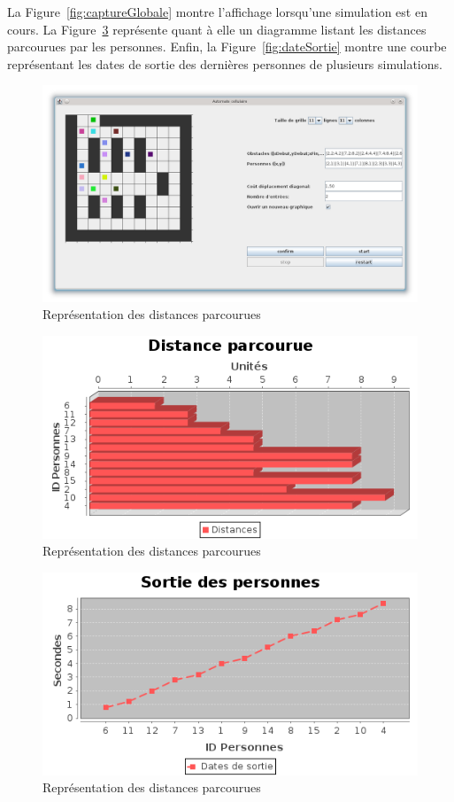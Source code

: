 	La Figure~\ref{fig:captureGlobale} montre l'affichage lorsqu'une simulation est en cours. La Figure~\ref{fig:distances_parcourues} représente quant à elle un diagramme listant les distances parcourues par les personnes. Enfin, la Figure~\ref{fig:dateSortie} montre une courbe représentant les dates de sortie des dernières personnes de plusieurs simulations.

	\begin{figure}[H]
	\centering
	\includegraphics[scale=0.4]{imagesPNG/captureGlobale.png}
	\caption{Représentation des distances parcourues\label{fig:distances_parcourues}}
	\end{figure}

	\begin{figure}[H]
	\centering
	\includegraphics[scale=0.7]{imagesPNG/distanceParcourue.png}
	\caption{Représentation des distances parcourues\label{fig:distances_parcourues}}
	\end{figure}
	
	\begin{figure}[H]
	\centering
	\includegraphics[scale=0.7]{imagesPNG/dateSortie.png}
	\caption{Représentation des distances parcourues\label{fig:distances_parcourues}}
	\end{figure}